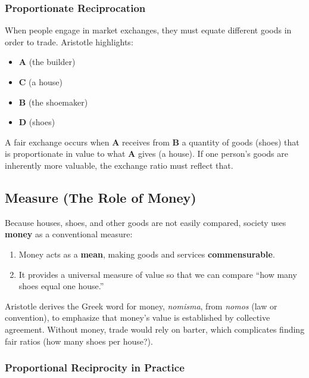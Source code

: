                 \subsubsection{Proportionate Reciprocation}

                    When people engage in market exchanges, they must equate different goods in order to trade. Aristotle highlights:
                    \begin{itemize}
                      \item \textbf{A} (the builder)
                      \item \textbf{C} (a house)
                      \item \textbf{B} (the shoemaker)
                      \item \textbf{D} (shoes)
                    \end{itemize}

                    A fair exchange occurs when \textbf{A} receives from \textbf{B} a quantity of goods (shoes) that is proportionate in value to what \textbf{A} gives (a house). If one person's goods are inherently more valuable, the exchange ratio must reflect that.

            \subsection{Measure (The Role of Money)}

                Because houses, shoes, and other goods are not easily compared, society uses \textbf{money} as a conventional measure:
                \begin{enumerate}
                  \item Money acts as a \textbf{mean}, making goods and services \textbf{commensurable}.
                  \item It provides a universal measure of value so that we can compare ``how many shoes equal one house.''
                \end{enumerate}
                
                Aristotle derives the Greek word for money, \emph{nomisma}, from \textit{nomos} (law or convention), to emphasize that money's value is established by collective agreement. Without money, trade would rely on barter, which complicates finding fair ratios (how many shoes per house?).

                \subsubsection{Proportional Reciprocity in Practice}

